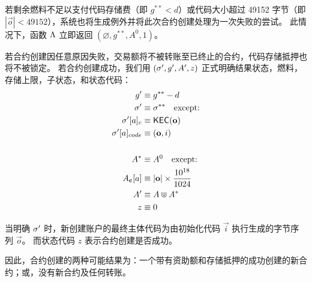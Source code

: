 若剩余燃料不足以支付代码存储费（即 $g^{**}<d$）或代码大小超过 49152 字节（即 $|\vec{o}|<49152$），系统也将生成例外并将此次合约创建处理为一次失败的尝试。
%
此情况下，函数 $\mathrm{\Lambda}$ 立即返回 $(\varnothing,g^{**},A^0,1)$。

若合约创建因任意原因失败，交易额将不被转账至已终止的合约，代码存储抵押也将不被锁定。
若合约创建成功，我们用 $\left(\mathbf{\sigma}', g', A', z\right)$  正式明确结果状态，燃料，存储上限，子状态，和状态代码：
\begin{align}
	g' &\equiv g^{**}-d \\
	\mathbf{\sigma}' &\equiv \mathbf{\sigma}^{**} \quad\mbox{except:} \\
		\mathbf{\sigma}'[a]_c &\equiv \mathsf{KEC}(\mathbf{o}) \\ 
		\mathbf{\sigma}'[a]_{code} &\equiv (\mathbf{o},i) \\
	\notag \\
	A^* &\equiv A^0 \quad\mbox{except:} \\
	A_{\bf c}[a] &\equiv |\mathbf{o}|\times \frac{10^{18}}{1024} \\
	A' &\equiv A \Cup A^{*} \\ 
	z &\equiv 0
\end{align}

当明确 $\mathbf{\sigma}'$ 时，新创建账户的最终主体代码为由初始化代码 $\vec{i}$ 执行生成的字节序列 $\vec{o}$。
而状态代码 $z$ 表示合约创建是否成功。

因此，合约创建的两种可能结果为：一个带有资助额和存储抵押的成功创建的新合约；或，没有新合约及任何转账。

